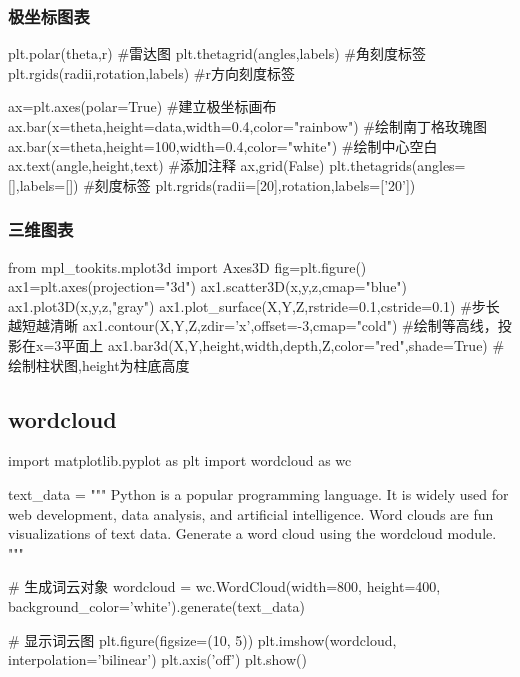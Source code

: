     \subsubsection{极坐标图表}
      \begin{codeblock}[language=python, caption={polar plots of plt}]
        plt.polar(theta,r) #雷达图
        plt.thetagrid(angles,labels) #角刻度标签
        plt.rgids(radii,rotation,labels) #r方向刻度标签

        ax=plt.axes(polar=True) #建立极坐标画布
        ax.bar(x=theta,height=data,width=0.4,color="rainbow") #绘制南丁格玫瑰图
        ax.bar(x=theta,height=100,width=0.4,color="white") #绘制中心空白
        ax.text(angle,height,text) #添加注释
        ax,grid(False)
        plt.thetagrids(angles=[],labels=[]) #刻度标签
        plt.rgrids(radii=[20],rotation,labels=['20'])
      \end{codeblock}

    \subsubsection{三维图表}
      \begin{codeblock}[language=python, caption={3D plots of plt}]
        from mpl_tookits.mplot3d import Axes3D
        fig=plt.figure()
        ax1=plt.axes(projection="3d")
        ax1.scatter3D(x,y,z,cmap="blue")
        ax1.plot3D(x,y,z,"gray")
        ax1.plot_surface(X,Y,Z,rstride=0.1,cstride=0.1) #步长越短越清晰
        ax1.contour(X,Y,Z,zdir='x',offset=-3,cmap="cold") #绘制等高线，投影在x=3平面上
        ax1.bar3d(X,Y,height,width,depth,Z,color="red",shade=True) #绘制柱状图,height为柱底高度
      \end{codeblock}

  \subsection{wordcloud}
    \begin{codeblock}[language=python, caption={wordcloud}]
      import matplotlib.pyplot as plt
      import wordcloud as wc

      text_data = """
      Python is a popular programming language.
      It is widely used for web development, data analysis, and artificial intelligence.
      Word clouds are fun visualizations of text data.
      Generate a word cloud using the wordcloud module.
      """

      # 生成词云对象
      wordcloud = wc.WordCloud(width=800, height=400, background_color='white').generate(text_data)

      # 显示词云图
      plt.figure(figsize=(10, 5))
      plt.imshow(wordcloud, interpolation='bilinear')
      plt.axis('off')
      plt.show()
    \end{codeblock}

